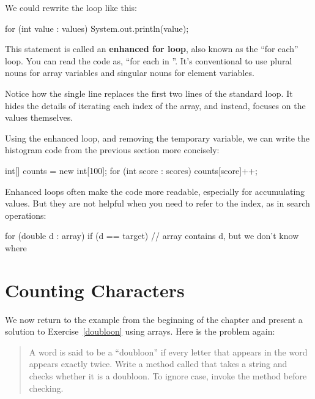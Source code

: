 We could rewrite the loop like this:

\begin{code}
for (int value : values) {
    System.out.println(value);
}
\end{code}


This statement is called an {\bf enhanced for loop}, also known as the ``for each'' loop.
You can read the code as, ``for each  in ''.
It's conventional to use plural nouns for array variables and singular nouns for element variables.

Notice how the single line  replaces the first two lines of the standard  loop.
It hides the details of iterating each index of the array, and instead, focuses on the values themselves.

Using the enhanced  loop, and removing the temporary variable, we can write the histogram code from the previous section more concisely:

\begin{code}
int[] counts = new int[100];
for (int score : scores) {
    counts[score]++;
}
\end{code}

Enhanced  loops often make the code more readable, especially for accumulating values.
But they are not helpful when you need to refer to the index, as in search operations:

\begin{code}
for (double d : array) {
    if (d == target) {
        // array contains d, but we don't know where
    }
}
\end{code}


\section{Counting Characters}

We now return to the example from the beginning of the chapter and present a solution to Exercise~\ref{doubloon} using arrays.
Here is the problem again:

\begin{quote}
A word is said to be a ``doubloon'' if every letter that appears in the word appears exactly twice.
Write a method called  that takes a string and checks whether it is a doubloon.
To ignore case, invoke the  method before checking.
\end{quote}

